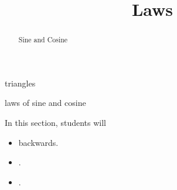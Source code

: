 \documentclass{ximera}
\title{Laws}
\begin{document}
\begin{abstract}
Sine and Cosine
\end{abstract}
\maketitle





triangles

laws of sine and cosine










\begin{sectionOutcomes}
In this section, students will 

\begin{itemize}
\item backwards.
\item .
\item .
\end{itemize}
\end{sectionOutcomes}
\end{document}
